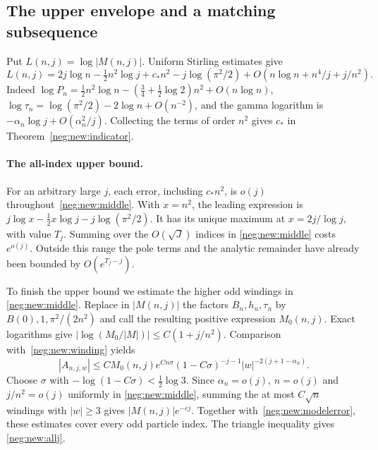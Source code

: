 \documentclass[11pt]{article}
\numberwithin{equation}{section}
\theoremstyle{definition}
\begin{document}
\subsection{The upper envelope and a matching subsequence}
\label{sec:jet-subsequence}

Put $L(n,j)=\log|M(n,j)|$.  Uniform Stirling estimates give
\begin{equation}
 L(n,j)=2j\log n-\tfrac12n^2\log j+c_*n^2
       -j\log(\pi^2/2)+O(n\log n+n^4/j+j/n^2).         \label{neg:new:logmodel}
\end{equation}
Indeed
$\log P_n=\tfrac12n^2\log n-(\tfrac34+\tfrac12\log2)n^2
+O(n\log n)$,
$\log\tau_n=\log(\pi^2/2)-2\log n+O(n^{-2})$, and the gamma
logarithm is $-\alpha_n\log j+O(\alpha_n^2/j)$. Collecting the
terms of order $n^2$ gives $c_*$ in Theorem~\ref{neg:new:indicator}.

\paragraph{The all-index upper bound.}
For an arbitrary large $j$, each error, including $c_*n^2$, is
$o(j)$ throughout~\eqref{neg:new:middle}.  With $x=n^2$, the
leading expression is
$j\log x-\tfrac12x\log j-j\log(\pi^2/2)$.
It has its unique maximum at $x=2j/\log j$, with value $T_j$.
Summing over the $O(\sqrt J)$ indices in \eqref{neg:new:middle}
costs $e^{o(j)}$. Outside this range the pole terms and the analytic
remainder have already been bounded by $O(e^{T_j-j})$.

To finish the upper bound we estimate the higher odd windings in
\eqref{neg:new:middle}. Replace in
$|M(n,j)|$ the factors $B_n,h_n,\tau_n$ by
$B(0),1,\pi^2/(2n^2)$ and call the resulting positive expression
$M_0(n,j)$.  Exact logarithms give
$|\log(M_0/|M|)|\le C(1+j/n^2)$.
Comparison with~\eqref{neg:new:winding} yields
\[
 |A_{n,j,w}|\le CM_0(n,j)e^{Cn\sigma}(1-C\sigma)^{-j-1}
                         |w|^{-2(j+1-\alpha_n)}.
\]
Choose $\sigma$ with $-\log(1-C\sigma)<\tfrac12\log3$.
Since $\alpha_n=o(j)$, $n=o(j)$ and $j/n^2=o(j)$ uniformly in
\eqref{neg:new:middle}, summing the at most $C\sqrt n$ windings with
$|w|\ge3$ gives $|M(n,j)|e^{-cj}$.
Together with~\eqref{neg:new:modelerror}, these estimates cover every
odd particle index.  The triangle inequality gives
\eqref{neg:new:allj}.
\end{document}
